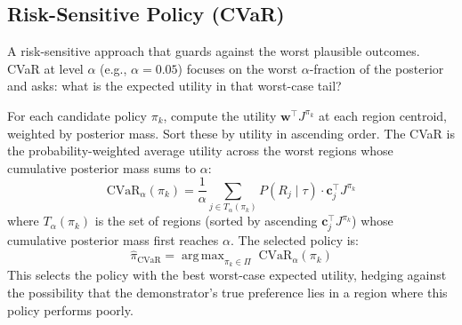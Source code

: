 \documentclass[11pt]{article}
\DeclareMathOperator*{\argmax}{arg\,max}
\begin{document}
\subsection{Risk-Sensitive Policy (CVaR)}
 
A risk-sensitive approach that guards against the worst plausible outcomes. CVaR at level $\alpha$ (e.g., $\alpha = 0.05$) focuses on the worst $\alpha$-fraction of the posterior and asks: what is the expected utility in that worst-case tail?
 
For each candidate policy $\pi_k$, compute the utility $\mathbf{w}^\top J^{\pi_k}$ at each region centroid, weighted by posterior mass. Sort these by utility in ascending order. The CVaR is the probability-weighted average utility across the worst regions whose cumulative posterior mass sums to $\alpha$:
\begin{equation}
    \text{CVaR}_\alpha(\pi_k) = \frac{1}{\alpha} \sum_{j \in T_\alpha(\pi_k)} P(R_j \mid \tau) \cdot \mathbf{c}_j^\top J^{\pi_k}
\end{equation}
where $T_\alpha(\pi_k)$ is the set of regions (sorted by ascending $\mathbf{c}_j^\top J^{\pi_k}$) whose cumulative posterior mass first reaches $\alpha$. The selected policy is:
\begin{equation}
    \hat{\pi}_{\text{CVaR}} = \argmax_{\pi_k \in \Pi}\; \text{CVaR}_\alpha(\pi_k)
\end{equation}
This selects the policy with the best worst-case expected utility, hedging against the possibility that the demonstrator's true preference lies in a region where this policy performs poorly.
\end{document}
